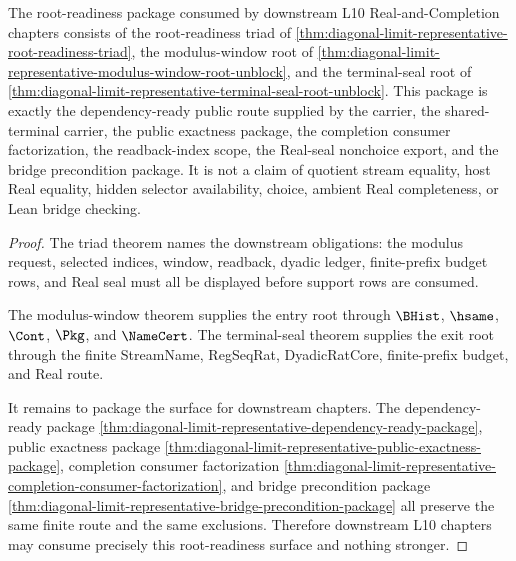 \begin{theorem}
\label{thm:diagonal-limit-representative-dependency-readiness-scope}
The root-readiness package consumed by downstream L10 Real-and-Completion chapters consists of the root-readiness triad of \autoref{thm:diagonal-limit-representative-root-readiness-triad}, the modulus-window root of \autoref{thm:diagonal-limit-representative-modulus-window-root-unblock}, and the terminal-seal root of \autoref{thm:diagonal-limit-representative-terminal-seal-root-unblock}. This package is exactly the dependency-ready public route supplied by the carrier, the shared-terminal carrier, the public exactness package, the completion consumer factorization, the readback-index scope, the Real-seal nonchoice export, and the bridge precondition package. It is not a claim of quotient stream equality, host Real equality, hidden selector availability, choice, ambient Real completeness, or Lean bridge checking.
\end{theorem}
\begin{proof}
The triad theorem names the downstream obligations: the modulus request, selected indices, window, readback, dyadic ledger, finite-prefix budget rows, and Real seal must all be displayed before support rows are consumed.

The modulus-window theorem supplies the entry root through $\BHist$, $\hsame$, $\Cont$, $\Pkg$, and $\NameCert$. The terminal-seal theorem supplies the exit root through the finite StreamName, RegSeqRat, DyadicRatCore, finite-prefix budget, and Real route.

It remains to package the surface for downstream chapters. The dependency-ready package \autoref{thm:diagonal-limit-representative-dependency-ready-package}, public exactness package \autoref{thm:diagonal-limit-representative-public-exactness-package}, completion consumer factorization \autoref{thm:diagonal-limit-representative-completion-consumer-factorization}, and bridge precondition package \autoref{thm:diagonal-limit-representative-bridge-precondition-package} all preserve the same finite route and the same exclusions. Therefore downstream L10 chapters may consume precisely this root-readiness surface and nothing stronger.
\end{proof}

